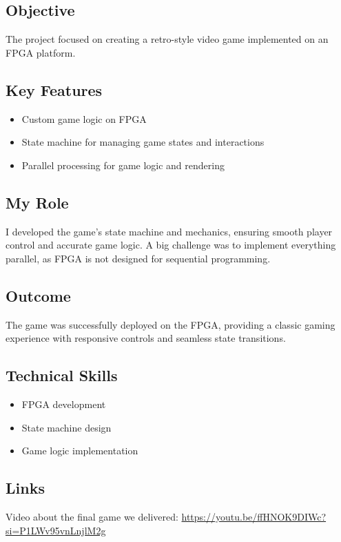 \documentclass{article}
\begin{document}
\subsection{Objective}
The project focused on creating a retro-style video game implemented on an FPGA platform.

\subsection{Key Features}
\begin{itemize}
    \item Custom game logic on FPGA
    \item State machine for managing game states and interactions
    \item Parallel processing for game logic and rendering
\end{itemize}

\subsection{My Role}
I developed the game's state machine and mechanics, ensuring smooth player control and accurate game logic.
A big challenge was to implement everything parallel, as FPGA is not designed for sequential programming.

\subsection{Outcome}
The game was successfully deployed on the FPGA, providing a classic gaming experience with responsive controls and seamless state transitions.

\subsection{Technical Skills}
\begin{itemize}
    \item FPGA development
    \item State machine design
    \item Game logic implementation
\end{itemize}

\subsection{Links}
Video about the final game we delivered:
\url{https://youtu.be/ffHNOK9DIWc?si=P1LWv95vnLnjlM2g}
\end{document}
